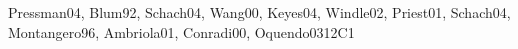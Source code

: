\begin{syllabus}
\begin{unit}{\SEToolsandEnvironments}{}{Pressman04, Blum92, Schach04, Wang00, Keyes04, Windle02, Priest01, Schach04, Montangero96, Ambriola01, Conradi00, Oquendo03}{12}{C1}
\begin{topics}%
    \item \SEToolsandEnvironmentsTopicSoftware
    \item \SEToolsandEnvironmentsTopicRelease
    \item \SEToolsandEnvironmentsTopicRequierements
    \item \SEToolsandEnvironmentsTopicTesting
    \item \SEToolsandEnvironmentsTopicProgramming
    \item \SEToolsandEnvironmentsTopicTool
\end{topics}
\begin{learningoutcomes}
    \item \SEToolsandEnvironmentsTopicSoftware[\Usage]
    \item \SEToolsandEnvironmentsTopicRelease[\Usage]
    \item \SEToolsandEnvironmentsTopicRequierements[\Usage]
    \item \SEToolsandEnvironmentsTopicTesting[\Usage]
    \item \SEToolsandEnvironmentsTopicProgramming[\Usage]
    \item \SEToolsandEnvironmentsTopicTool[\Usage]
\end{learningoutcomes}
\end{unit}


\end{syllabus}
